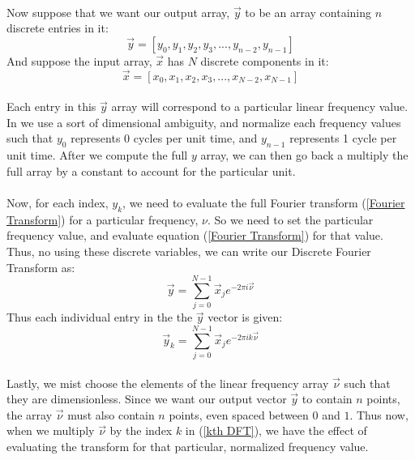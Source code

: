 \documentclass[12pt,letterpaper]{article}
\begin{document}
\paragraph*{}Now suppose that we want our output array, $\vec{y}$ to be an array containing $n$ discrete entries in it:
\begin{equation}
\vec{y} = [y_0 , y_1 , y_2 , y_3 , ... , y _{n-2} , y_{n-1} ]
\end{equation}
And suppose the input array, $\vec{x}$ has $N$ discrete components in it:
\begin{equation}
\vec{x} = [x_0 , x_1 , x_2 , x_3 , ... , x _{N-2} , x_{N-1} ]
\end{equation}
\paragraph*{}Each entry in this $\vec{y}$ array will correspond to a particular linear frequency value.  In we use a sort of dimensional ambiguity, and normalize each frequency values such that $y_0$ represents $0$ cycles per unit time, and $y_{n-1}$ represents 1 cycle per unit time. After we compute the full $y$ array, we can then go back a multiply the full array by a constant to account for the particular unit.
\paragraph*{}Now, for each index, $y_k$, we need to evaluate the full Fourier transform (\ref{Fourier Transform}) for a particular frequency, $\nu$. So we need to set the particular frequency value, and evaluate equation (\ref{Fourier Transform}) for that value. Thus, no using these discrete variables, we can write our Discrete Fourier Transform as:
\begin{equation}
\label{Discrete Fourier Transform}
\vec{y} = \sum_{j=0}^{N-1} \vec{x}_j e^{-2\pi i \vec{\nu}}
\end{equation}
Thus each individual entry in the the $\vec{y}$ vector is given:
\begin{equation}
\label{kth DFT}
\vec{y}_k = \sum_{j=0}^{N-1} \vec{x}_j e^{-2\pi ik \vec{\nu}}
\end{equation}
\paragraph*{}Lastly, we mist choose the elements of the linear frequency array $\vec{\nu}$ such that they are dimensionless. Since we want our output vector $\vec{y}$ to contain $n$ points, the array $\vec{\nu}$ must also contain $n$ points, even spaced between $0$ and $1$. Thus now, when we multiply $\vec{\nu}$ by the index $k$ in (\ref{kth DFT}), we have the effect of evaluating the transform for that particular, normalized frequency value. 
\end{document}
